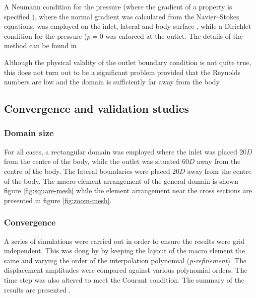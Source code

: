 A Neumann condition for the pressure (where the gradient of a property is specified \citet{tu2007}), where the normal gradient was calculated from the Navier--Stokes equations, was employed on the inlet, lateral and body surface \citep{gresho1987}, while a Dirichlet condition for the pressure ($p=0$ was enforced at the outlet. The details of the method can be found in \citet{Thompson2006,Thompson1996a}

 Although the physical validity of the outlet boundary condition is not quite true, this does not turn out to be a significant problem provided that the Reynolds numbers are low and the domain is sufficiently far away from the body.


 
\subsection{Convergence and validation studies}

\subsubsection{Domain size}

 For all cases, a rectangular domain was employed where the inlet was placed $20D$ from the centre of the body, while the outlet was situated $60D$ away from the centre of the body. The lateral boundaries were placed $20D$ away from the centre of the body. The macro element arrangement of the general domain is shown figure \ref{fig:square-mesh} while the element arrangement near the cross sections are presented in figure \ref{fig:zoom-mesh}. 
 
 
 
 
 

\subsubsection{Convergence}

A series of simulations were carried out in order to ensure the results were grid independent. This was dong by by keeping the layout of the macro element the same and varying the order of the interpolation polynomial (\emph{p-refinement}). The displacement amplitudes were compared against various polynomial orders. The time step was also altered to meet the Courant condition. The summary of the results are presented .


















